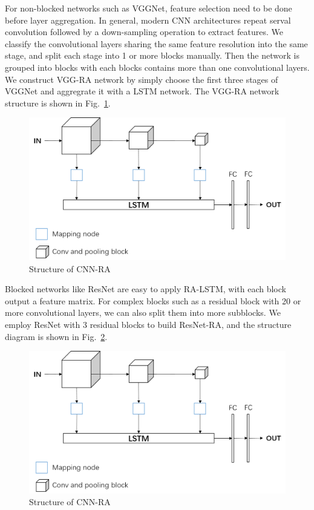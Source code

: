 \documentclass[runningheads]{llncs}
\begin{document}
For non-blocked networks such as VGGNet, feature selection need to be done before layer aggregation. In general, modern CNN architectures repeat serval convolution followed by a down-sampling operation to extract features. We classify the convolutional layers sharing the same feature resolution into the same stage, and split each stage into 1 or more blocks manually. Then the network is grouped into blocks with each blocks contains more than one convolutional layers. We construct VGG-RA network by simply choose the first three stages of VGGNet and aggregrate it with a LSTM network. The VGG-RA network structure is shown in Fig.~\ref{fig:VGG-RA}.
\begin{figure}  
	\centering
	\includegraphics[width=12cm]{Figures/CNN-RA.png}
	\caption{Structure of CNN-RA}
	\label{fig:VGG-RA}
\end{figure}

Blocked networks like ResNet are easy to apply RA-LSTM, with each block output a feature matrix. For complex blocks such as a residual block with 20 or more convolutional layers, we can also split them into more subblocks. We employ ResNet with 3 residual blocks to build ResNet-RA, and the structure diagram is shown in Fig.~\ref{fig:ResNet-RA}.
\begin{figure}  
	\centering
	\includegraphics[width=12cm]{Figures/CNN-RA.png}
	\caption{Structure of CNN-RA}
	\label{fig:ResNet-RA}
\end{figure}
\end{document}
